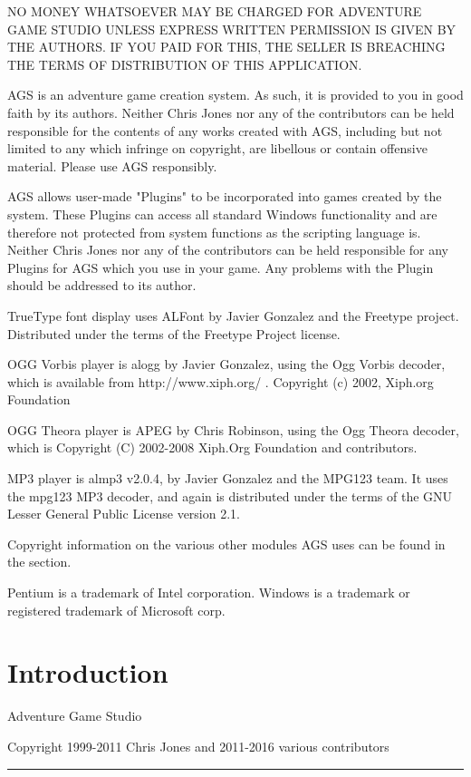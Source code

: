 NO MONEY WHATSOEVER MAY BE CHARGED FOR ADVENTURE GAME STUDIO UNLESS EXPRESS
WRITTEN PERMISSION IS GIVEN BY THE AUTHORS. IF YOU PAID FOR THIS, THE SELLER
IS BREACHING THE TERMS OF DISTRIBUTION OF THIS APPLICATION.

AGS is an adventure game creation system. As such, it is provided to you in good faith by its authors. Neither Chris Jones nor any of the contributors can be held responsible for the contents of any works created with AGS, including but not limited to any which infringe on copyright, are libellous or contain offensive material. Please use AGS responsibly.

AGS allows user-made "Plugins" to be incorporated into games created by the system. These Plugins can access all standard Windows functionality and are therefore not protected from system functions as the scripting language is. Neither Chris Jones nor any of the contributors can be held responsible for any Plugins for AGS which you use in your game. Any problems with the Plugin should be addressed to its author.

TrueType font display uses ALFont by Javier Gonzalez and the Freetype project. Distributed
under the terms of the Freetype Project license.

OGG Vorbis player is alogg by Javier Gonzalez, using the Ogg Vorbis decoder, which is available
from http://www.xiph.org/ .  Copyright (c) 2002, Xiph.org Foundation

OGG Theora player is APEG by Chris Robinson, using the Ogg Theora decoder, which is
Copyright (C) 2002-2008 Xiph.Org Foundation and contributors.

MP3 player is almp3 v2.0.4, by Javier Gonzalez and the MPG123 team. It uses the mpg123 MP3 decoder,
and again is distributed under the terms of the GNU Lesser General Public License version 2.1.

Copyright information on the various other modules AGS uses can be found in the
 section.

Pentium is a trademark of Intel corporation.
Windows is a trademark or registered trademark of Microsoft corp.

\chapter{Introduction}%

\Large{Adventure Game Studio}

\large{Copyright 1999-2011 Chris Jones and 2011-2016 various contributors}\hrule

